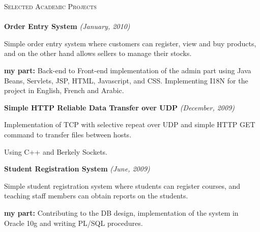 \documentclass[letterpaper,12pt]{article}
\newcommand{\lineunder}{\vspace*{-8pt} \\ \hspace*{-8pt} \hrulefill \\}
\newcommand{\interval}[1] { \textit{(#1)} }
\newcommand{\header}[1]{{\hspace*{0pt}\vspace*{6pt} \textsc{#1}} \vspace*{-6pt} \lineunder}
\newcommand{\projects}[2]{{ \textbf{#1} #2\\ }}
\newenvironment{details}{\vspace*{-4pt} \begin{list}{\topsep 0pt \itemsep -2pt}}{\vspace*{4pt}\end{list}}
\begin{document}
\header{Selected Academic Projects}
\projects{Order Entry System}{\interval{January, 2010}}
	\begin{details}
		\item Simple order entry system where customers can register, view and buy products, and on the other hand allows sellers to manage their stocks.
		\item \textbf{my part:} Back-end to Front-end implementation of the admin part using Java Beans, Servlets, JSP, HTML, Javascript, and CSS. Implementing I18N for the project in English, French and Arabic.
	\end{details}
\projects{Simple HTTP Reliable Data Transfer over UDP}{\interval{December, 2009}}
  \begin{details}
    \item Implementation of TCP with selective repeat over UDP and simple HTTP GET command to transfer files between hosts.
    \item Using C++ and Berkely Sockets.
  \end{details}
\projects{Student Registration System}{\interval{June, 2009}}
  \begin{details}
    \item Simple student registration system where students can register courses, and teaching staff members can obtain reports on the students.
    \item \textbf{my part:} Contributing to the DB design, implementation of the system in Oracle 10g and writing PL/SQL procedures.
  \end{details}
\end{document}
